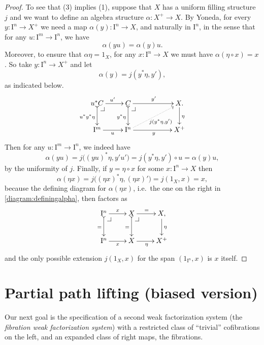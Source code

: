 \documentclass[11pt]{article}
\makeatletter
\newcommand{\pbcorner}[1][dr]{\save*!/#1-1.2pc/#1:(-1,1)@^{|-}\restore}
\newcommand{\I}{\ensuremath{\mathrm{I}}}
\theoremstyle{remark}
\theoremstyle{definition}
\makeatother
\begin{document}
\begin{proof}
To see that (3) implies (1), suppose that $X$ has a uniform filling structure $j$ and we want to define an algebra structure $\alpha : X^+ \to X$. By Yoneda, for every $y : \I^n \to X^+$ we need a map $\alpha(y) : \I^n \to X$, and naturally in $\I^n$, in the sense that for any $u : \I^m \to \I^n$, we have
\begin{equation}\label{eq:proof,plusstructure}
\alpha(yu) = \alpha(y)u.
\end{equation}
Moreover, to ensure that $\alpha\eta = 1_X$, for any $x : \I^n \to X$ we must have $\alpha(\eta\circ x) = x$. So take $y : \I^n \to X^+$  and let $$\alpha(y) = j(y^*\eta, y'),$$
as indicated below.
\begin{equation}\label{diagram:definingalpha}
\xymatrix{
u^*C \ar@{>->}[d]_{u^*y^*\eta} \ar[r]^{u'} \pbcorner &  C \ar@{>->}[d]_{y^*\eta} \ar[rr]^{y'}\pbcorner && X \ar[d]^\eta . \\
\I^{m} \ar[r]_{u} & \I^{n} \ar@{.>}[rru]_{j(y^*\eta,y')} \ar[rr]_{y} && X^+
}
\end{equation}
Then for any $u : \I^m \to \I^n$, we indeed have 
$$\alpha(yu) =  j\big( (yu)^*\eta, y'u' \big) = j(y^*\eta, y')\circ u = \alpha(y)u,$$
 by the uniformity of $j$. Finally, if $y=\eta\circ x$ for some $x : \I^n\to X$ then 
 $$\alpha(\eta x) =  j\big( (\eta x)^*\eta, (\eta x)'\big) = j(1_X, x) = x,$$
 because the defining diagram for $\alpha(\eta x)$, i.e.\ the one on the right in \eqref{diagram:definingalpha}, then factors as
 \begin{equation}\label{diagram:definingalphatwo}
\xymatrix{
\I^n \ar@{>->}[d]_{=} \ar[r]^{x} \pbcorner &  X \ar@{>->}[d]_{=} \ar[r]^{=}\pbcorner & X \ar[d]^\eta , \\
\I^{n} \ar[r]_{x} & X  \ar[r]_{\eta} & X^+
}
\end{equation}
and the only possible extension $j(1_X, x)$ for the span $(1_{\I^n}, x)$ is  $x$ itself.
 \end{proof}

\section{Partial path lifting (biased version)}

Our next goal is the specification of a second weak factorization system (the \emph{fibration weak factorization system}) with a restricted class of ``trivial'' cofibrations on the left, and an expanded class of right maps, the fibrations. 
\end{document}
